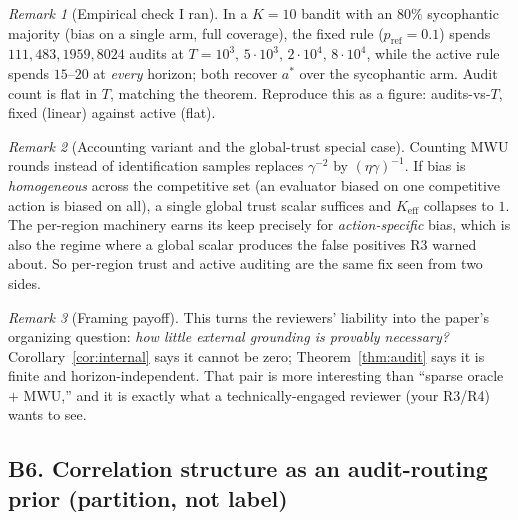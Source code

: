 \documentclass[11pt]{article}
\theoremstyle{definition}
\theoremstyle{remark}
\newtheorem{remark}{Remark}
\newcommand{\astar}{a^{\ast}}
\begin{document}
\begin{remark}[Empirical check I ran]
In a $K{=}10$ bandit with an $80\%$ sycophantic majority (bias on a single arm, full coverage),
the fixed rule ($p_{\mathrm{ref}}{=}0.1$) spends $111, 483, 1959, 8024$ audits at
$T=10^3,\,5{\cdot}10^3,\,2{\cdot}10^4,\,8{\cdot}10^4$, while the active rule spends
$15$--$20$ at \emph{every} horizon; both recover $\astar$ over the sycophantic arm. Audit count is
flat in $T$, matching the theorem. Reproduce this as a figure: audits-vs-$T$, fixed (linear)
against active (flat).
\end{remark}

\begin{remark}[Accounting variant and the global-trust special case]
Counting MWU rounds instead of identification samples replaces $\gamma^{-2}$ by $(\eta\gamma)^{-1}$.
If bias is \emph{homogeneous} across the competitive set (an evaluator biased on one competitive
action is biased on all), a single global trust scalar suffices and $K_{\mathrm{eff}}$ collapses to
$1$. The per-region machinery earns its keep precisely for \emph{action-specific} bias, which is
also the regime where a global scalar produces the false positives R3 warned about. So per-region
trust and active auditing are the same fix seen from two sides.
\end{remark}

\begin{remark}[Framing payoff]
This turns the reviewers' liability into the paper's organizing question: \emph{how little external
grounding is provably necessary?} Corollary~\ref{cor:internal} says it cannot be zero;
Theorem~\ref{thm:audit} says it is finite and horizon-independent. That pair is more interesting
than ``sparse oracle $+$ MWU,'' and it is exactly what a technically-engaged reviewer (your R3/R4)
wants to see.
\end{remark}

\subsection*{B6. Correlation structure as an audit-routing prior (partition, not label)}
\end{document}
